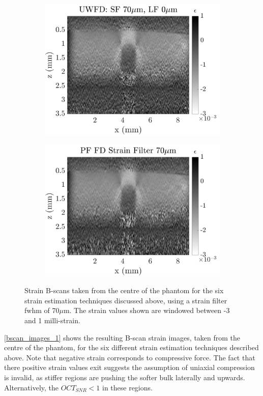\begin{figure}[b!]
\begin{subfigure}{0.49\textwidth}
        \includegraphics[width=\textwidth]{figures/uwfd_fr70_lr0.png}
	\end{subfigure}
    \begin{subfigure}{0.49\textwidth}
    	\centering
        \includegraphics[width=\textwidth]{figures/fdsm_fr70_lr0.png}
    \end{subfigure}
	\caption{Strain B-scans taken from the centre of the phantom for the six strain estimation techniques discussed above, using a strain filter \ac{fwhm} of 70$\mu$m. The strain values shown are windowed between -3 and 1 milli-strain.}
    \label{bscan_images_1}	
\end{figure}

\autoref{bscan_images_1} shows the resulting B-scan strain images, taken from the centre of the phantom, for the six different strain estimation techniques described above. Note that negative strain corresponds to compressive force. The fact that there positive strain values exit suggests the assumption of uniaxial compression is invalid, as stiffer regions are pushing the softer bulk laterally and upwards. Alternatively, the $OCT_{SNR}<1$ in these regions.

